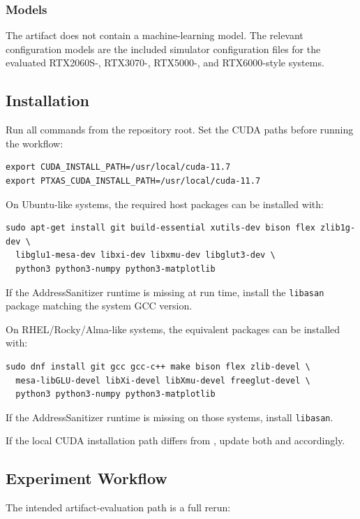 \subsubsection{Models}
The artifact does not contain a machine-learning model. The relevant configuration models are the included simulator configuration files for the evaluated RTX2060S-, RTX3070-, RTX5000-, and RTX6000-style systems.

\subsection{Installation}
Run all commands from the repository root. Set the CUDA paths before running the workflow:

\begin{verbatim}
export CUDA_INSTALL_PATH=/usr/local/cuda-11.7
export PTXAS_CUDA_INSTALL_PATH=/usr/local/cuda-11.7
\end{verbatim}

On Ubuntu-like systems, the required host packages can be installed with:

\begin{verbatim}
sudo apt-get install git build-essential xutils-dev bison flex zlib1g-dev \
  libglu1-mesa-dev libxi-dev libxmu-dev libglut3-dev \
  python3 python3-numpy python3-matplotlib
\end{verbatim}

If the AddressSanitizer runtime is missing at run time, install the \texttt{libasan}
package matching the system GCC version.

On RHEL/Rocky/Alma-like systems, the equivalent packages can be installed with:

\begin{verbatim}
sudo dnf install git gcc gcc-c++ make bison flex zlib-devel \
  mesa-libGLU-devel libXi-devel libXmu-devel freeglut-devel \
  python3 python3-numpy python3-matplotlib
\end{verbatim}

If the AddressSanitizer runtime is missing on those systems, install \texttt{libasan}.

If the local CUDA installation path differs from , update both  and  accordingly.

\subsection{Experiment Workflow}
The intended artifact-evaluation path is a full rerun:

